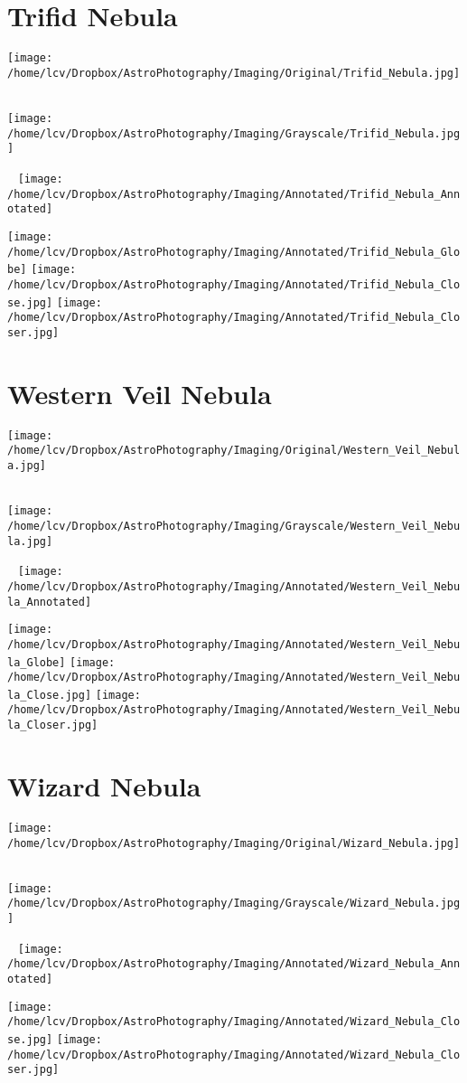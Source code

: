\section{Trifid Nebula}
\texttt{[image: /home/lcv/Dropbox/AstroPhotography/Imaging/Original/Trifid\_Nebula.jpg]}
{\footnotesize\color{white}

}\ \\
\texttt{[image: /home/lcv/Dropbox/AstroPhotography/Imaging/Grayscale/Trifid\_Nebula.jpg]}
\begin{center}
 \ \newpage
\texttt{[image: /home/lcv/Dropbox/AstroPhotography/Imaging/Annotated/Trifid\_Nebula\_Annotated]}

\texttt{[image: /home/lcv/Dropbox/AstroPhotography/Imaging/Annotated/Trifid\_Nebula\_Globe]}
\texttt{[image: /home/lcv/Dropbox/AstroPhotography/Imaging/Annotated/Trifid\_Nebula\_Close.jpg]}
\texttt{[image: /home/lcv/Dropbox/AstroPhotography/Imaging/Annotated/Trifid\_Nebula\_Closer.jpg]}
\end{center}
\section{Western Veil Nebula}
\texttt{[image: /home/lcv/Dropbox/AstroPhotography/Imaging/Original/Western\_Veil\_Nebula.jpg]}
{\footnotesize\color{white}

}\ \\
\texttt{[image: /home/lcv/Dropbox/AstroPhotography/Imaging/Grayscale/Western\_Veil\_Nebula.jpg]}
\begin{center}
 \ \newpage
\texttt{[image: /home/lcv/Dropbox/AstroPhotography/Imaging/Annotated/Western\_Veil\_Nebula\_Annotated]}

\texttt{[image: /home/lcv/Dropbox/AstroPhotography/Imaging/Annotated/Western\_Veil\_Nebula\_Globe]}
\texttt{[image: /home/lcv/Dropbox/AstroPhotography/Imaging/Annotated/Western\_Veil\_Nebula\_Close.jpg]}
\texttt{[image: /home/lcv/Dropbox/AstroPhotography/Imaging/Annotated/Western\_Veil\_Nebula\_Closer.jpg]}
\end{center}
\section{Wizard Nebula}
\texttt{[image: /home/lcv/Dropbox/AstroPhotography/Imaging/Original/Wizard\_Nebula.jpg]}
{\footnotesize\color{white}

}\ \\
\texttt{[image: /home/lcv/Dropbox/AstroPhotography/Imaging/Grayscale/Wizard\_Nebula.jpg]}
\begin{center}
 \ \newpage
\texttt{[image: /home/lcv/Dropbox/AstroPhotography/Imaging/Annotated/Wizard\_Nebula\_Annotated]}

\texttt{[image: /home/lcv/Dropbox/AstroPhotography/Imaging/Annotated/Wizard\_Nebula\_Close.jpg]}
\texttt{[image: /home/lcv/Dropbox/AstroPhotography/Imaging/Annotated/Wizard\_Nebula\_Closer.jpg]}
\end{center}

